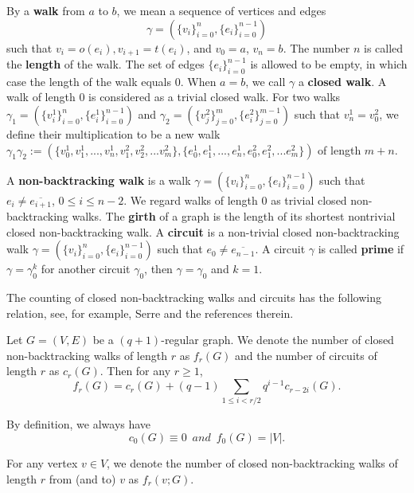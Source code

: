 \documentclass{article}
\begin{document}
By a \textbf{walk} from $a$ to $b$, we mean a sequence of vertices and edges $$\gamma=(\{v_i\}_{i=0}^{n}, \{e_i\}_{i=0}^{n-1})$$ such that $v_i=o(e_i), v_{i+1}=t(e_i)$, and $v_0=a$, $v_n=b$. The number $n$ is called the \textbf{length} of the walk. The set of edges $\{e_i\}_{i=0}^{n-1}$ is allowed to be empty, in which case the length of the walk equals $0$. When $a=b$, we call $\gamma$ a \textbf{closed walk}. A walk of length $0$ is considered as a trivial closed walk. For two walks $\gamma_1=(\{v^1_i\}_{i=0}^{n}, \{e^1_i\}_{i=0}^{n-1})$ and $\gamma_2=(\{v^2_j\}_{j=0}^{m}, \{e^2_i\}_{j=0}^{m-1})$ such that $v^1_n=v^2_0$, we define their multiplication to be a new walk $\gamma_1 \gamma_2:=(\{v^1_0,v^1_1,...,v^1_n,v^2_1,v^2_2,...v^2_m\}, 
\{e^1_0,e^1_1,...,e^1_n, e^2_0,e^2_1,...e^2_m\})$ of length $m+n$.


\begin{definition}\label{defofnbws}
    A \textbf{non-backtracking walk} is a walk $\gamma=(\{v_i\}_{i=0}^{n}, \{e_i\}_{i=0}^{n-1})$ such that $e_{i}\neq \overline{e_{i+1}}$, $0 \leq i\leq n-2$. We regard walks of length $0$ as trivial closed non-backtracking walks. The \textbf{girth} of a graph is the length of its shortest nontrivial closed non-backtracking walk. A \textbf{circuit} is a non-trivial closed non-backtracking walk $\gamma=(\{v_i\}_{i=0}^{n}, \{e_i\}_{i=0}^{n-1})$ such that $e_{0}\neq \overline{e_{n-1}}$. A circuit $\gamma$ is called \textbf{prime} if  $\gamma=\gamma_0^k$ for another circuit $\gamma_0$, then $\gamma=\gamma_0$ and $k=1$. 
\end{definition}
The counting of closed non-backtracking walks and circuits has the following relation, see, for example, Serre \cite{Ser97} and the references therein.
\begin{lemma}\label{NBWandcircle}
Let $G=(V,E)$ be a $(q+1)\text{-}$regular graph. We denote the number of closed non-backtracking walks of length $r$ as $f_r(G)$ and the number of circuits of length $r$ as $c_r(G)$. Then for any $r\geq 1$,
\begin{equation}\label{frcr}
    f_r(G)=c_r(G)+(q-1)\sum_{1\leq i<  r/2}q^{i-1}c_{r-2i}(G).
\end{equation}
\end{lemma}

\begin{remark}
By definition, we always have 
$$c_0(G)\equiv 0 \,\,\, and \,\,\, f_0(G)=|V|.$$
\end{remark}
For any vertex $v\in V$, we denote the number of closed non-backtracking walks of length $r$ from (and to) $v$ as $f_r(v;G)$.
\end{document}
